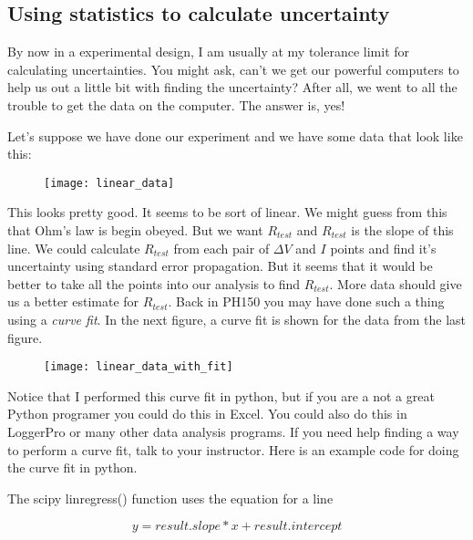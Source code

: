 \subsection{Using statistics to calculate uncertainty}

By now in a experimental design, I am usually at my tolerance limit for calculating uncertainties. You might ask, can't we get our powerful computers to help us out a little bit with finding the uncertainty? After all, we went to all the trouble to get the data on the computer. The answer is, yes!

Let's suppose we have done our experiment and we have some data that look like this: 

\begin{figure}[h!]
	\centering
	\texttt{[image: linear\_data]}
\end{figure}

This looks pretty good. It seems to be sort of linear. We might guess from
this that Ohm's law is begin obeyed. But we want $R_{test}$ and $R_{test}$
is the slope of this line. We could calculate $R_{test}$ from each pair of $%
\Delta V$ and $I$ points and find it's uncertainty using standard error
propagation. But it seems that it would be better to take all the points
into our analysis to find $R_{test}.$ More data should give us a better
estimate for $R_{test}.$ Back in PH150 you may have done such a thing using
a \emph{curve fit}. In the next figure, a curve fit is shown for the data
from the last figure. 

\begin{figure}[h!]
	\centering
	\texttt{[image: linear\_data\_with\_fit]}
\end{figure}

Notice that I performed this curve fit in python, but if you are a not a
great Python programer you could do this in Excel. You could also
do this in LoggerPro or many other data analysis programs. If you need help finding a way to perform a curve fit, talk to your instructor. Here is an example code for doing the curve fit in python.




The scipy linregress() function uses the equation for a line 

\begin{equation*}
	y = result.slope*x + result.intercept
\end{equation*}

